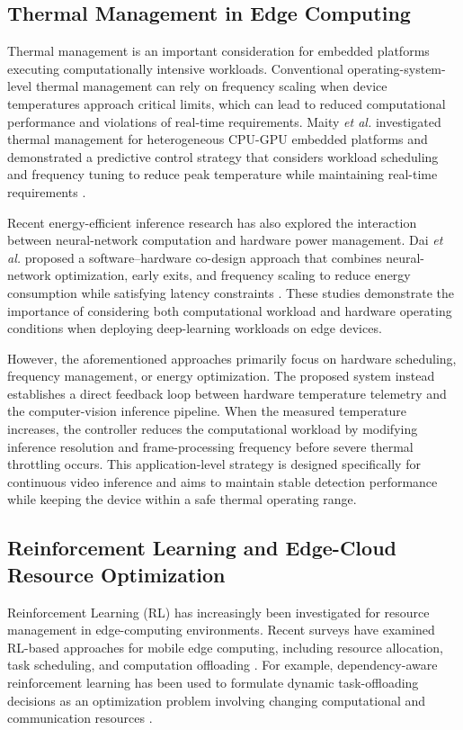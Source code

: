 \documentclass{ieeeaccess}
\begin{document}
\subsection{Thermal Management in Edge Computing}

Thermal management is an important consideration for embedded platforms executing computationally intensive workloads. Conventional operating-system-level thermal management can rely on frequency scaling when device temperatures approach critical limits, which can lead to reduced computational performance and violations of real-time requirements. Maity \emph{et al.} investigated thermal management for heterogeneous CPU-GPU embedded platforms and demonstrated a predictive control strategy that considers workload scheduling and frequency tuning to reduce peak temperature while maintaining real-time requirements \cite{b19}.

Recent energy-efficient inference research has also explored the interaction between neural-network computation and hardware power management. Dai \emph{et al.} proposed a software--hardware co-design approach that combines neural-network optimization, early exits, and frequency scaling to reduce energy consumption while satisfying latency constraints \cite{b8}. These studies demonstrate the importance of considering both computational workload and hardware operating conditions when deploying deep-learning workloads on edge devices.

However, the aforementioned approaches primarily focus on hardware scheduling, frequency management, or energy optimization. The proposed system instead establishes a direct feedback loop between hardware temperature telemetry and the computer-vision inference pipeline. When the measured temperature increases, the controller reduces the computational workload by modifying inference resolution and frame-processing frequency before severe thermal throttling occurs. This application-level strategy is designed specifically for continuous video inference and aims to maintain stable detection performance while keeping the device within a safe thermal operating range.

\subsection{Reinforcement Learning and Edge-Cloud Resource Optimization}

Reinforcement Learning (RL) has increasingly been investigated for resource
management in edge-computing environments. Recent surveys have examined
RL-based approaches for mobile edge computing, including resource allocation,
task scheduling, and computation offloading \cite{b7}. For example,
dependency-aware reinforcement learning has been used to formulate dynamic
task-offloading decisions as an optimization problem involving changing
computational and communication resources \cite{b9}.
\end{document}
